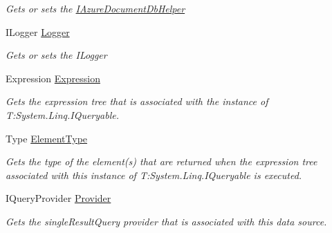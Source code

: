 \begin{DoxyCompactItemize}
\begin{DoxyCompactList}\small\item\em Gets or sets the \hyperlink{interfaceCqrs_1_1Azure_1_1DocumentDb_1_1IAzureDocumentDbHelper}{I\+Azure\+Document\+Db\+Helper} \end{DoxyCompactList}\item 
I\+Logger \hyperlink{classCqrs_1_1Azure_1_1DocumentDb_1_1DataStores_1_1AzureDocumentDbDataStore_af46a754a1576e4c2422b8a5d642abc5c_af46a754a1576e4c2422b8a5d642abc5c}{Logger}
\begin{DoxyCompactList}\small\item\em Gets or sets the I\+Logger \end{DoxyCompactList}\item 
Expression \hyperlink{classCqrs_1_1Azure_1_1DocumentDb_1_1DataStores_1_1AzureDocumentDbDataStore_a47d5ae1b47f4166210d1caab58467529_a47d5ae1b47f4166210d1caab58467529}{Expression}
\begin{DoxyCompactList}\small\item\em Gets the expression tree that is associated with the instance of T\+:\+System.\+Linq.\+I\+Queryable. \end{DoxyCompactList}\item 
Type \hyperlink{classCqrs_1_1Azure_1_1DocumentDb_1_1DataStores_1_1AzureDocumentDbDataStore_a6c007c12b342eeeb936ba748e5391bc3_a6c007c12b342eeeb936ba748e5391bc3}{Element\+Type}
\begin{DoxyCompactList}\small\item\em Gets the type of the element(s) that are returned when the expression tree associated with this instance of T\+:\+System.\+Linq.\+I\+Queryable is executed. \end{DoxyCompactList}\item 
I\+Query\+Provider \hyperlink{classCqrs_1_1Azure_1_1DocumentDb_1_1DataStores_1_1AzureDocumentDbDataStore_ac7beb3868691d1cba378fa58e3f0e999_ac7beb3868691d1cba378fa58e3f0e999}{Provider}
\begin{DoxyCompactList}\small\item\em Gets the single\+Result\+Query provider that is associated with this data source. \end{DoxyCompactList}\end{DoxyCompactItemize}


